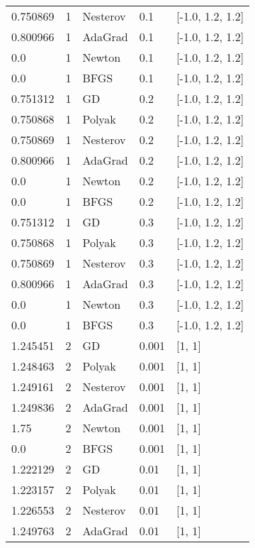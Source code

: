 \begin{tabular}{lllll}
 0.750869 &        1 & Nesterov &    0.1 & [-1.0, 1.2, 1.2] \\
 0.800966 &        1 &  AdaGrad &    0.1 & [-1.0, 1.2, 1.2] \\
      0.0 &        1 &   Newton &    0.1 & [-1.0, 1.2, 1.2] \\
      0.0 &        1 &     BFGS &    0.1 & [-1.0, 1.2, 1.2] \\
 0.751312 &        1 &       GD &    0.2 & [-1.0, 1.2, 1.2] \\
 0.750868 &        1 &   Polyak &    0.2 & [-1.0, 1.2, 1.2] \\
 0.750869 &        1 & Nesterov &    0.2 & [-1.0, 1.2, 1.2] \\
 0.800966 &        1 &  AdaGrad &    0.2 & [-1.0, 1.2, 1.2] \\
      0.0 &        1 &   Newton &    0.2 & [-1.0, 1.2, 1.2] \\
      0.0 &        1 &     BFGS &    0.2 & [-1.0, 1.2, 1.2] \\
 0.751312 &        1 &       GD &    0.3 & [-1.0, 1.2, 1.2] \\
 0.750868 &        1 &   Polyak &    0.3 & [-1.0, 1.2, 1.2] \\
 0.750869 &        1 & Nesterov &    0.3 & [-1.0, 1.2, 1.2] \\
 0.800966 &        1 &  AdaGrad &    0.3 & [-1.0, 1.2, 1.2] \\
      0.0 &        1 &   Newton &    0.3 & [-1.0, 1.2, 1.2] \\
      0.0 &        1 &     BFGS &    0.3 & [-1.0, 1.2, 1.2] \\
 1.245451 &        2 &       GD &  0.001 &           [1, 1] \\
 1.248463 &        2 &   Polyak &  0.001 &           [1, 1] \\
 1.249161 &        2 & Nesterov &  0.001 &           [1, 1] \\
 1.249836 &        2 &  AdaGrad &  0.001 &           [1, 1] \\
     1.75 &        2 &   Newton &  0.001 &           [1, 1] \\
      0.0 &        2 &     BFGS &  0.001 &           [1, 1] \\
 1.222129 &        2 &       GD &   0.01 &           [1, 1] \\
 1.223157 &        2 &   Polyak &   0.01 &           [1, 1] \\
 1.226553 &        2 & Nesterov &   0.01 &           [1, 1] \\
 1.249763 &        2 &  AdaGrad &   0.01 &           [1, 1] \\

\end{tabular}
